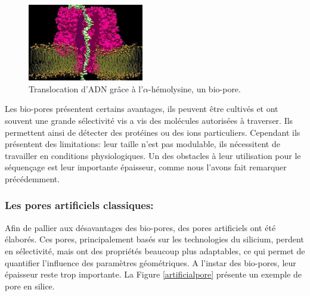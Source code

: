 \documentclass[a4paper,11pt]{article}
\begin{document}
\begin{figure}[H]
\begin{center}
\includegraphics[width=0.45\textwidth]{biopore.jpg}

\caption{Translocation d'ADN grâce à l'$\alpha$-hémolysine, un bio-pore.}
\label{biopore}
\end{center}
\end{figure}

Les bio-pores présentent certains avantages, ils peuvent être cultivés et ont souvent une grande sélectivité vis a vis des molécules autorisées à traverser. Ils permettent ainsi de détecter des protéines ou des ions particuliers. Cependant ils présentent des limitations: leur taille n'est pas modulable, ils nécessitent de travailler en conditions physiologiques. Un des obstacles à leur utilisation pour le séquençage est leur importante épaisseur, comme nous l'avons fait remarquer précédemment.


\subsubsection*{Les pores artificiels classiques:}

Afin de pallier aux désavantages des bio-pores, des pores artificiels ont été élaborés. Ces pores, principalement basés sur les technologies du silicium, perdent en sélectivité, mais ont des propriétés beaucoup plus adaptables, ce qui permet de quantifier l'influence des paramètres géométriques. A l'instar des bio-pores, leur épaisseur reste trop importante. La Figure \ref{artificialpore} présente un exemple de pore en silice.
\end{document}
